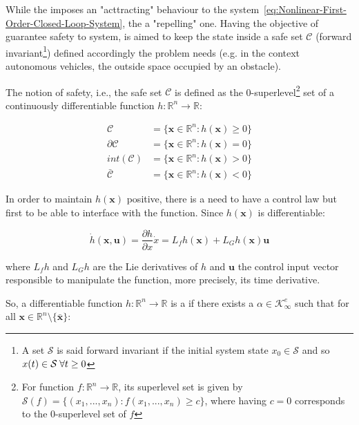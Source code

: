 While the  imposes an "acttracting" behaviour to the system~\eqref{eq:Nonlinear-First-Order-Closed-Loop-System}, the  a "repelling" one. Having the objective of guarantee safety to system, is aimed to keep the state inside a safe set \(\mathcal{C}\) (forward invariant\footnote{A set \(\mathcal{S}\) is said forward invariant if the initial system state \( x_0 \in \mathcal{S}\) and so \(x(t) \in \mathcal{S} \hspace{0.25em} \forall t \geq 0\) }) defined accordingly the problem needs (e.g. in the context autonomous vehicles, the outside space occupied by an obstacle).\par 
The notion of safety, i.e., the safe set \(\mathcal{C}\) is defined as the 0-superlevel\footnote{For function \(f: \mathbb{R}^n \to \mathbb{R}\), its superlevel set is given by \(\mathcal{S}(f) = \{(x_1,...,x_n): f(x_1,...,x_n) \geq c\}\), where having \(c = 0\) corresponds to the 0-superlevel set of \(f\)} set of a continuously differentiable function \( h: \mathbb{R}^n \rightarrow \mathbb{R}  \):

\begin{align}
        \mathcal{C} &= \{ \mathbf{x} \in \mathbb{R}^n : h( \mathbf{x} )\geq 0\} \label{eq:safe-set}\\
        \partial\mathcal{C} &= \{ \mathbf{x} \in \mathbb{R}^n : h( \mathbf{x} ) = 0\} \label{eq:boundary_safe_set}\\
        int(\mathcal{C}) &= \{ \mathbf{x} \in \mathbb{R}^n : h( \mathbf{x} ) > 0\} \label{eq:interior_safe_set} \\
        \bar{\mathcal{C}} &= \{ \mathbf{x} \in \mathbb{R}^n : h( \mathbf{x} ) < 0\} \label{eq:unsafe_set}
\end{align}


In order to maintain  \(h( \mathbf{x} )\) positive, there is a need to have a control law but first to be able to interface with the function. Since \(h( \mathbf{x} )\) is differentiable:  

\[\dot{h}(\mathbf{x}, \mathbf{u}) = \frac{\partial h}{\partial x}\dot{x} = L_fh(\mathbf{x}) + L_Gh(\mathbf{x})\mathbf{u} \]

where \(L_fh\) and \(L_Gh\) are the Lie derivatives of \(h\) and \(\mathbf{u}\) the control input vector responsible to manipulate the function, more precisely, its time derivative.\par

So, a differentiable function \( h: \mathbb{R}^n \rightarrow \mathbb{R}  \) is a  if there exists a \( \alpha \in \mathcal{K}^e_{\infty}  \) such that for all \( \mathbf{x} \in \mathbb{R}^n \setminus \{\bar{\mathbf{x}}\} \):

